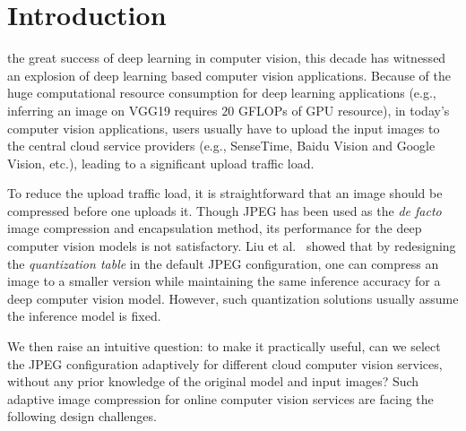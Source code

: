 \section{Introduction}
\label{sec: introduction}

 the great success of deep learning in computer vision, this decade has witnessed an explosion of deep learning based computer vision applications. Because of the huge computational resource consumption for deep learning applications (e.g., inferring an image on VGG19 \cite{VGG19} requires $20$ GFLOPs of GPU resource), in today's computer vision applications, users usually have to upload the input images to the central cloud service providers (e.g., SenseTime, Baidu Vision and Google Vision, etc.), leading to a significant upload traffic load. 

To reduce the upload traffic load, it is straightforward that an image should be compressed before one uploads it. Though JPEG has been used as the {\em de facto} image compression and encapsulation method, its performance for the deep computer vision models is not satisfactory. Liu et al.~\cite{DeepN-JPEG} showed that by redesigning the \emph{quantization table} in the default JPEG configuration, one can compress an image to a smaller version while maintaining the same inference accuracy for a deep computer vision model. However, such quantization solutions usually assume the inference model is fixed. 

We then raise an intuitive question: to make it practically useful, can we select the JPEG configuration adaptively for different cloud computer vision services, without any prior knowledge of the original model and input images? Such adaptive image compression for online computer vision services are facing the following design challenges.


